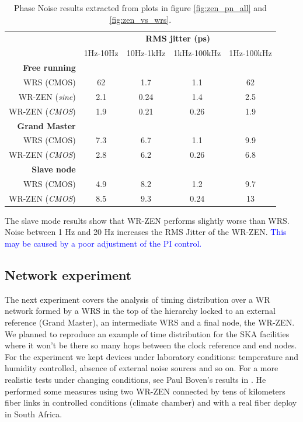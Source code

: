     
 \begin{table}\centering
     \begin{tabular}{@{} rcccc@{}}%
         & \multicolumn{4}{c}{\bfseries{RMS jitter (ps)}} \\
         \cmidrule(l){2-5}
         & 1Hz-10Hz & 10Hz-1kHz & 1kHz-100kHz  & 1Hz-100kHz \\ \midrule
         \textbf{Free running}\\
         \small{WRS (CMOS)}             & 62  & 1.7  & 1.1  & 62  \\
         \small{WR-ZEN (\textit{sine})} & 2.1 & 0.24 & 1.4  & 2.5 \\
         \small{WR-ZEN (\textit{CMOS})} & 1.9 & 0.21 & 0.26 & 1.9 \\
         \cmidrule(l){2-5}
         
         \textbf{Grand Master}\\
         \small{WRS (CMOS)}             & 7.3 & 6.7 & 1.1 & 9.9\\
         \small{WR-ZEN (\textit{CMOS})} & 2.8 & 6.2 & 0.26 & 6.8\\
         \cmidrule(l){2-5}
         
         \textbf{Slave node}\\
         \small{WRS (CMOS)}             & 4.9 & 8.2 & 1.2  & 9.7\\
         \small{WR-ZEN (\textit{CMOS})} & 8.5 & 9.3 & 0.24 & 13\\
         
         \bottomrule
        \end{tabular}
        \caption{Phase Noise results extracted from plots in figure \ref{fig:zen_pn_all} and \ref{fig:zen_vs_wrs}.}
        \label{tab:pn_results}
\end{table}

The slave mode results show that WR-ZEN performs slightly worse than WRS. Noise between 1 Hz and 20 Hz increases the RMS Jitter of the WR-ZEN. \textcolor{blue}{This may be caused by a poor adjustment of the PI control.}


\subsection{Network experiment} %
\label{subsec: net_exp}

The next experiment covers the analysis of timing distribution over a WR network formed by a WRS in the top of the hierarchy locked to an external reference (Grand Master), an intermediate WRS and a final node, the WR-ZEN. We planned to reproduce an example of time distribution for the SKA facilities where it won't be there so many hops between the clock reference and end nodes. For the experiment we kept devices under laboratory conditions: temperature and humidity controlled, absence of external noise sources and so on. For a more realistic tests under changing conditions, see Paul Boven's results in \cite{paultests}. He performed some measures using two WR-ZEN connected by tens of kilometers fiber links in controlled conditions (climate chamber) and with a real fiber deploy in South Africa.

